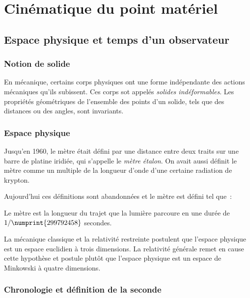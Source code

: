 \chapter{Cinématique du point matériel}
\label{chap:cinematiquedupoint}
\minitoc
\minilof
\minilot

\section{Espace physique et temps d'un observateur}
\label{chap1-sec:espacephysique}

\subsection{Notion de solide}
\label{chap1-subsec:notion de solide}

En mécanique, certains corps physiques ont une forme indépendante des actions mécaniques qu'ils subissent. Ces corps sot appelés \emph{solides indéformables}. Les propriétés géométriques de l'ensemble des points d'un solide, tels que des distances ou des angles, sont invariants.

\subsection{Espace physique}
\label{chap1-subsec:espacephysique}

Jusqu'en 1960, le mètre était défini par une distance entre deux traits sur une barre de platine iridiée, qui s'appelle le \emph{mètre étalon}. On avait aussi définit le mètre comme un multiple de la longueur d'onde d'une certaine radiation de krypton.

Aujourd'hui ces définitions sont abandonnées et le mètre est défini tel que~:
\begin{defdef}
  Le mètre est la longueur du trajet que la lumière parcoure en une durée de $1/\numprint{299792458}$ secondes.
\end{defdef}

La mécanique classique et la relativité restreinte postulent que l'espace physique est un espace euclidien à trois dimensions. La relativité générale remet en cause cette hypothèse et postule plutôt que l'espace physique est un espace de Minkowski à quatre dimensions.

\subsection{Chronologie et définition de la seconde}
\label{chap1-subsec:chronologie}

